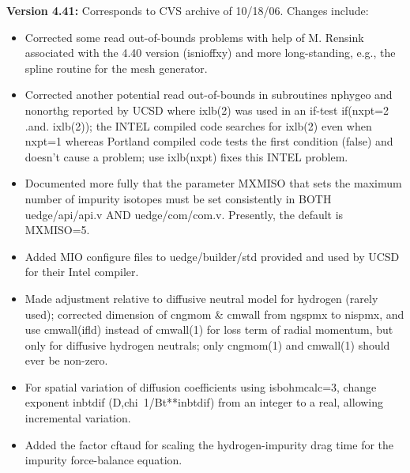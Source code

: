 \documentclass [12pt]{article}
\begin{document}
\noindent\textbf{Version 4.41:} Corresponds to CVS archive of 10/18/06.  
Changes include:
\begin{itemize}
   \item Corrected some read out-of-bounds problems with help of
	 M. Rensink associated with the 4.40 version (isnioffxy) 
	 and more long-standing, e.g., the spline routine for the 
	 mesh generator.
   \item Corrected another potential read out-of-bounds in 
	 subroutines nphygeo and nonorthg reported by UCSD where 
 	 ixlb(2) was used in an if-test if(nxpt=2 .and. ixlb(2)); 
	 the INTEL compiled code searches for ixlb(2) even when 
	 nxpt=1 whereas Portland compiled code tests the first 
	 condition (false) and doesn't cause a problem; use 
	 ixlb(nxpt) fixes this INTEL problem.
   \item Documented more fully that the parameter MXMISO that sets
	 the maximum number of impurity isotopes must be set 
	 consistently in BOTH uedge/api/api.v AND uedge/com/com.v.
	 Presently, the default is MXMISO=5.
   \item Added MIO configure files to uedge/builder/std provided and
	 used by UCSD for their Intel compiler.
   \item Made adjustment relative to diffusive neutral model for
	 hydrogen (rarely used); corrected dimension of cngmom \& 
	 cmwall from ngspmx to nispmx, and use cmwall(ifld) instead 
	 of cmwall(1) for loss term of radial momentum, but only for 
	 diffusive hydrogen neutrals; only cngmom(1) and cmwall(1)
	 should ever be non-zero.
   \item For spatial variation of diffusion coefficients using
	 isbohmcalc=3, change exponent inbtdif (D,chi~1/Bt**inbtdif)
	 from an integer to a real, allowing incremental variation.
   \item Added the factor cftaud for scaling the hydrogen-impurity
	 drag time for the impurity force-balance equation.
\end{itemize}
\end{document}
